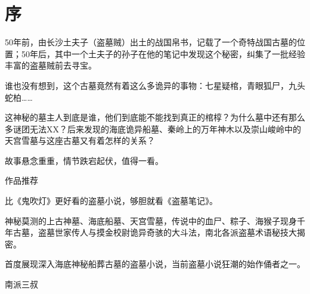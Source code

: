 

\chapter*{序}

\begin{fzliukai}
\setlength\parskip{\baselineskip-\ccwd}
    50年前，由长沙土夫子（盗墓贼）出土的战国帛书，记载了一个奇特战国古墓的位置；50年后，其中一个土夫子的孙子在他的笔记中发现这个秘密，纠集了一批经验丰富的盗墓贼前去寻宝。
    
    谁也没有想到，这个古墓竟然有着这么多诡异的事物：七星疑棺，青眼狐尸，九头蛇柏……
    
    这神秘的墓主人到底是谁，他们到底能不能找到真正的棺椁？为什么墓中还有那么多谜团无法XX？后来发现的海底诡异船墓、秦岭上的万年神木以及崇山峻岭中的天宫雪墓与这座古墓又有着怎样的关系？
    
    故事悬念重重，情节跌宕起伏，值得一看。
    
    作品推荐
    
    比《鬼吹灯》更好看的盗墓小说，够胆就看《盗墓笔记》。
    
    神秘莫测的上古神墓、海底船墓、天宫雪墓，传说中的血尸、粽子、海猴子现身千年古墓，盗墓世家传人与摸金校尉诡异奇骇的大斗法，南北各派盗墓术语秘技大揭密。
    
    首度展现深入海底神秘船葬古墓的盗墓小说，当前盗墓小说狂潮的始作俑者之一。
    
\bigskip\mbox{}\fzqiti\large\hfill 南派三叔\KG
\end{fzliukai}

\cleardoublepage

\tableofcontents
